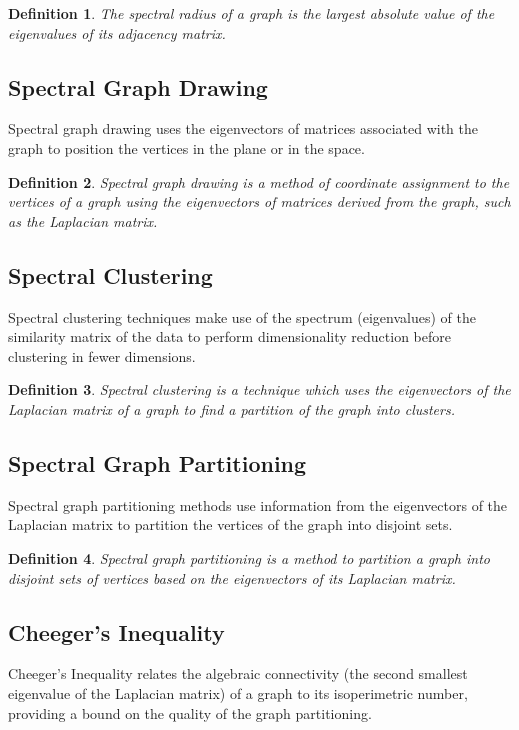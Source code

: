 \documentclass{article}
\newtheorem{definition}{Definition}
\begin{document}
\begin{definition}
	The \textit{spectral radius} of a graph is the largest absolute value of the eigenvalues of its adjacency matrix.
\end{definition}

\subsection{Spectral Graph Drawing}
Spectral graph drawing uses the eigenvectors of matrices associated with the graph to position the vertices in the plane or in the space.

\begin{definition}
	\textit{Spectral graph drawing} is a method of coordinate assignment to the vertices of a graph using the eigenvectors of matrices derived from the graph, such as the Laplacian matrix.
\end{definition}

\subsection{Spectral Clustering}
Spectral clustering techniques make use of the spectrum (eigenvalues) of the similarity matrix of the data to perform dimensionality reduction before clustering in fewer dimensions.

\begin{definition}
	\textit{Spectral clustering} is a technique which uses the eigenvectors of the Laplacian matrix of a graph to find a partition of the graph into clusters.
\end{definition}

\subsection{Spectral Graph Partitioning}
Spectral graph partitioning methods use information from the eigenvectors of the Laplacian matrix to partition the vertices of the graph into disjoint sets.

\begin{definition}
	\textit{Spectral graph partitioning} is a method to partition a graph into disjoint sets of vertices based on the eigenvectors of its Laplacian matrix.
\end{definition}

\subsection{Cheeger's Inequality}
Cheeger's Inequality relates the algebraic connectivity (the second smallest eigenvalue of the Laplacian matrix) of a graph to its isoperimetric number, providing a bound on the quality of the graph partitioning.
\end{document}
